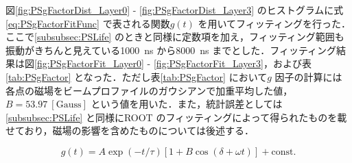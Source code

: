 図\ref{fig:PSgFactorDist_Layer0} - \ref{fig:PSgFactorDist_Layer3} のヒストグラムに式\eqref{eq:PSgFactorFitFunc} で表される関数$g(t)$ を用いてフィッティングを行った．ここで\ref{subsubsec:PSLife} のときと同様に定数項を加え，フィッティング範囲も振動がきちんと見えている1000~ns から8000~ns までとした．フィッティング結果は図\ref{fig:PSgFactorFit_Layer0} - \ref{fig:PSgFactorFit_Layer3}，および表\ref{tab:PSgFactor} となった．ただし表\ref{tab:PSgFactor} において$g$ 因子の計算には各点の磁場をビームプロファイルのガウシアンで加重平均した値，$B = 53.97~[\mathrm{Gauss}]$ という値を用いた．また，統計誤差としては\ref{subsubsec:PSLife} と同様にROOT のフィッティングによって得られたものを載せており，磁場の影響を含めたものについては後述する．

\begin{equation}
g(t) = A \exp(-t / \tau) [1 + B \cos(\delta + \omega t)] + \mathrm{const.}
\label{eq:PSgFactorFitFunc}
\end{equation}

